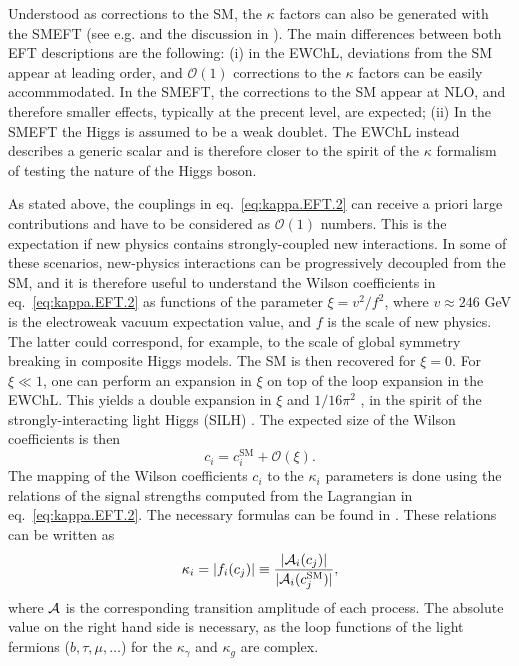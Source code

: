 Understood as corrections to the SM, the $\kappa$ factors can also be generated with the SMEFT (see e.g.\cite{Ghezzi:2015vva} and the discussion in \cite{Brivio:2017vri}). The main differences between both EFT descriptions are the following: (i) in the EWChL, deviations from the SM appear at leading order, and $\mathcal{O}(1)$ corrections to the $\kappa$ factors can be easily accommmodated. In the SMEFT, the corrections to the SM appear at NLO, and therefore smaller effects, typically at the precent level, are expected; (ii) In the SMEFT the Higgs is assumed to be a weak doublet. The EWChL instead describes a generic scalar and is therefore closer to the spirit of the $\kappa$ formalism of testing the nature of the Higgs boson.
 
As stated above, the couplings in eq.~\eqref{eq:kappa.EFT.2} can receive a priori large contributions and have to be considered as $\mathcal{O}(1)$ numbers. This is the expectation if new physics contains strongly-coupled new interactions. In some of these scenarios, new-physics interactions can be progressively decoupled from the SM, and it is therefore useful to understand the Wilson coefficients in eq.~\eqref{eq:kappa.EFT.2} as functions of the parameter $\xi = v^{2}/f^{2}$, where $v\approx 246$ GeV is the electroweak vacuum expectation value, and $f$ is the scale of new physics. The latter could correspond, for example, to the scale of global symmetry breaking in composite Higgs models. The SM is then recovered for $\xi=0$. For $\xi\ll 1$, one can perform an expansion in $\xi$ on top of the loop expansion in the EWChL. This yields a double expansion in $\xi$ and $1/16\pi^{2}$ \cite{Buchalla:2014eca}, in the spirit of the strongly-interacting light Higgs (SILH) \cite{Giudice:2007fh}. The expected size of the Wilson coefficients is then
\begin{equation}
  \label{eq:kappa.EFT.4}
    c_{i} =  c_{i}^{\text{SM}} + \mathcal{O}(\xi).
\end{equation}
The mapping of the Wilson coefficients $c_{i}$ to the $\kappa_{i}$ parameters is done using the relations of the signal strengths computed from the Lagrangian in eq.~\eqref{eq:kappa.EFT.2}. The necessary formulas can be found in \cite{Buchalla:2015qju,deBlas:2018tjm}. These relations can be written as
%
\begin{equation}
\label{eq:kappa.EFT.5}
  \kappa_{i} =  |f_i(c_{j})| \equiv \frac{|{\cal A}_i(c_{j})|}{|{\cal A}_i(c_{j}^{\text{SM}})|}, 
\end{equation}
%
where ${\cal A}$ is the corresponding transition amplitude of each process. 
The absolute value on the right hand side is necessary, as the loop functions of the light fermions ($b,\tau,\mu,\dots$) for the $\kappa_{\gamma}$ and $\kappa_{g}$ are complex.

